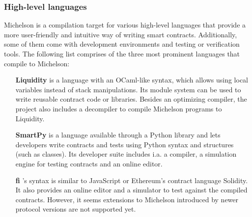\subsubsection{High-level languages}
Michelson is a compilation target for various high-level languages that provide a more user-friendly and intuitive way of writing smart contracts. Additionally, some of them come with development environments and testing or verification tools. The following list comprises of the three most prominent languages that compile to Michelson:
\begin{itemize}
\item[\textbf{Liquidity}] \cite{liquidity} is a language with an OCaml-like syntax, which allows using local variables instead of stack manipulations. Its module system can be used to write reusable contract code or libraries. Besides an optimizing compiler, the project also includes a decompiler to compile Michelson programs to Liquidity.
\item[\textbf{SmartPy}] \cite{smartpy} is a language available through a Python library and lets developers write contracts and tests using Python syntax and structures (such as classes). Its developer suite includes i.a. a compiler, a simulation engine for testing contracts and an online editor.
\item [\textbf{fi}] 's \cite{fi} syntax is similar to JavaScript or Ethereum's contract language Solidity. It also provides an online editor and a simulator to test against the compiled contracts. However, it seems extensions to Michelson introduced by newer protocol versions are not supported yet.
\end{itemize}

